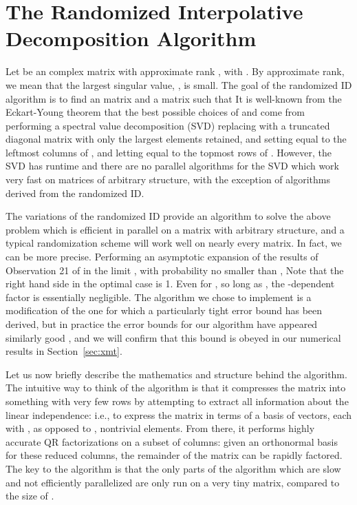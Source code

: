 \documentclass[11pt]{article}
\begin{document}
\section{The Randomized Interpolative Decomposition Algorithm}
Let  be an  complex matrix with approximate rank , with .  By approximate rank, we mean that the  largest singular value, , is small. The goal of the randomized ID algorithm \cite{rokpnas} is to find an  matrix  and a  matrix  such that It is well-known from the Eckart-Young theorem \cite{eckart} that the best possible choices of  and  come from performing a spectral value decomposition (SVD)  replacing  with a truncated diagonal matrix  with only the largest  elements retained, and setting  equal to the leftmost  columns of , and letting  equal to the topmost  rows of .  However, the SVD has runtime  and there are no parallel algorithms for the SVD which work very fast on matrices of arbitrary structure, with the exception of algorithms derived from the randomized ID.

The variations of the randomized ID provide an algorithm to solve the above problem which is efficient in parallel on a matrix with arbitrary structure, and a typical randomization scheme will work well on nearly every matrix.   In fact, we can be more precise.   Performing an asymptotic expansion of the results of Observation 21 of \cite{rokyale1} in the limit , with probability no smaller than ,
Note that the right hand side in the optimal case is 1.   Even for , so long as , the -dependent factor is essentially negligible.  The algorithm we chose to implement is a modification of the one for which a particularly tight error bound has been derived, but in practice the error bounds for our algorithm have appeared similarly good \cite{rokyale2}, and we will confirm that this bound is obeyed in our numerical results in Section~\ref{sec:xmt}. 



Let us now briefly describe the mathematics and structure behind the algorithm.    The intuitive way to think of the algorithm is that it compresses the matrix  into something with very few rows by attempting to extract all information about the linear independence: i.e., to express the matrix in terms of a basis of vectors, each with , as opposed to , nontrivial elements.  From there, it performs highly accurate QR factorizations on a subset of columns: given an orthonormal basis for these reduced columns, the remainder of the matrix can be rapidly factored.  The key to the algorithm is that the only parts of the algorithm which are slow and not efficiently parallelized are only run on a very tiny matrix, compared to the size of .
\end{document}
